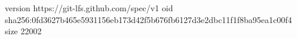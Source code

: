 version https://git-lfs.github.com/spec/v1
oid sha256:0fd3627b465e5931156eb173d42f5b676fb6127d3e2dbc11f1f8ba95ea1c00f4
size 22002
